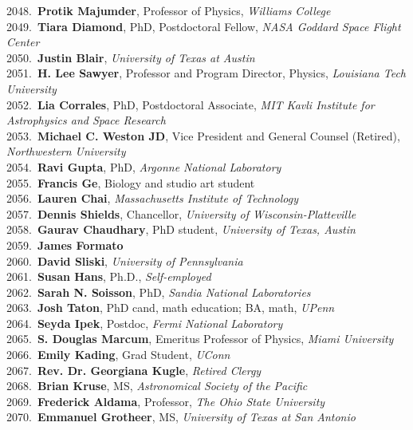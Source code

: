 2048.~{\bf Protik Majumder}, Professor of Physics, {\sl Williams College} \\
2049.~{\bf Tiara Diamond}, PhD, Postdoctoral Fellow, {\sl NASA Goddard Space Flight Center} \\
2050.~{\bf Justin Blair}, {\sl University of Texas at Austin} \\
2051.~{\bf H. Lee Sawyer}, Professor and Program Director, Physics, {\sl Louisiana Tech University} \\
2052.~{\bf Lia Corrales}, PhD, Postdoctoral Associate, {\sl MIT Kavli Institute for Astrophysics and Space Research} \\
2053.~{\bf Michael C. Weston JD}, Vice President and General Counsel (Retired), {\sl Northwestern University} \\
2054.~{\bf Ravi Gupta}, PhD, {\sl Argonne National Laboratory} \\
2055.~{\bf Francis Ge}, Biology and studio art student \\
2056.~{\bf Lauren Chai}, {\sl Massachusetts Institute of Technology} \\
2057.~{\bf Dennis Shields}, Chancellor, {\sl University of Wisconsin-Platteville} \\
2058.~{\bf Gaurav Chaudhary}, PhD student, {\sl University of Texas, Austin} \\
2059.~{\bf James Formato} \\
2060.~{\bf David Sliski}, {\sl University of Pennsylvania } \\
2061.~{\bf Susan Hans}, Ph.D., {\sl Self-employed} \\
2062.~{\bf Sarah N. Soisson}, PhD, {\sl Sandia National Laboratories} \\
2063.~{\bf Josh Taton}, PhD cand, math education; BA, math, {\sl UPenn} \\
2064.~{\bf Seyda Ipek}, Postdoc, {\sl Fermi National Laboratory} \\
2065.~{\bf S. Douglas Marcum}, Emeritus Professor of Physics, {\sl Miami University} \\
2066.~{\bf Emily Kading}, Grad Student, {\sl UConn} \\
2067.~{\bf Rev. Dr. Georgiana Kugle}, {\sl Retired Clergy} \\
2068.~{\bf Brian Kruse}, MS, {\sl Astronomical Society of the Pacific} \\
2069.~{\bf Frederick Aldama}, Professor, {\sl The Ohio State University} \\
2070.~{\bf Emmanuel Grotheer}, MS, {\sl University of Texas at San Antonio} \\
